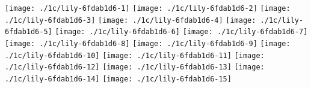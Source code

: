 \texttt{[image: ./1c/lily-6fdab1d6-1]}%
\ifx\betweenLilyPondSystem \undefined
  \linebreak
\else
  \expandafter{}%
\fi
\texttt{[image: ./1c/lily-6fdab1d6-2]}%
\ifx\betweenLilyPondSystem \undefined
  \linebreak
\else
  \expandafter{}%
\fi
\texttt{[image: ./1c/lily-6fdab1d6-3]}%
\ifx\betweenLilyPondSystem \undefined
  \linebreak
\else
  \expandafter{}%
\fi
\texttt{[image: ./1c/lily-6fdab1d6-4]}%
\ifx\betweenLilyPondSystem \undefined
  \linebreak
\else
  \expandafter{}%
\fi
\texttt{[image: ./1c/lily-6fdab1d6-5]}%
\ifx\betweenLilyPondSystem \undefined
  \linebreak
\else
  \expandafter{}%
\fi
\texttt{[image: ./1c/lily-6fdab1d6-6]}%
\ifx\betweenLilyPondSystem \undefined
  \linebreak
\else
  \expandafter{}%
\fi
\texttt{[image: ./1c/lily-6fdab1d6-7]}%
\ifx\betweenLilyPondSystem \undefined
  \linebreak
\else
  \expandafter{}%
\fi
\texttt{[image: ./1c/lily-6fdab1d6-8]}%
\ifx\betweenLilyPondSystem \undefined
  \linebreak
\else
  \expandafter{}%
\fi
\texttt{[image: ./1c/lily-6fdab1d6-9]}%
\ifx\betweenLilyPondSystem \undefined
  \linebreak
\else
  \expandafter{}%
\fi
\texttt{[image: ./1c/lily-6fdab1d6-10]}%
\ifx\betweenLilyPondSystem \undefined
  \linebreak
\else
  \expandafter{}%
\fi
\texttt{[image: ./1c/lily-6fdab1d6-11]}%
\ifx\betweenLilyPondSystem \undefined
  \linebreak
\else
  \expandafter{}%
\fi
\texttt{[image: ./1c/lily-6fdab1d6-12]}%
\ifx\betweenLilyPondSystem \undefined
  \linebreak
\else
  \expandafter{}%
\fi
\texttt{[image: ./1c/lily-6fdab1d6-13]}%
\ifx\betweenLilyPondSystem \undefined
  \linebreak
\else
  \expandafter{}%
\fi
\texttt{[image: ./1c/lily-6fdab1d6-14]}%
\ifx\betweenLilyPondSystem \undefined
  \linebreak
\else
  \expandafter{}%
\fi
\texttt{[image: ./1c/lily-6fdab1d6-15]}%
\ifx\betweenLilyPondSystem \undefined
